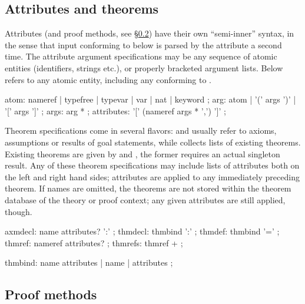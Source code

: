 \subsection{Attributes and theorems}\label{sec:syn-att}

Attributes (and proof methods, see \S\ref{sec:syn-meth}) have their own
``semi-inner'' syntax, in the sense that input conforming to
 below is parsed by the attribute a second time.  The
attribute argument specifications may be any sequence of atomic entities
(identifiers, strings etc.), or properly bracketed argument lists.  Below
 refers to any atomic entity, including any
 conforming to .

\begin{rail}
  atom: nameref | typefree | typevar | var | nat | keyword
  ;
  arg: atom | '(' args ')' | '[' args ']'
  ;
  args: arg *
  ;
  attributes: '[' (nameref args * ',') ']'
  ;
\end{rail}

Theorem specifications come in several flavors:  and
 usually refer to axioms, assumptions or results of goal
statements, while  collects lists of existing theorems.
Existing theorems are given by  and ,
the former requires an actual singleton result.  Any of these theorem
specifications may include lists of attributes both on the left and right hand
sides; attributes are applied to any immediately preceding theorem.  If names
are omitted, the theorems are not stored within the theorem database of the
theory or proof context; any given attributes are still applied, though.

\begin{rail}
  axmdecl: name attributes? ':'
  ;
  thmdecl: thmbind ':'
  ;
  thmdef: thmbind '='
  ;
  thmref: nameref attributes?
  ;
  thmrefs: thmref +
  ;

  thmbind: name attributes | name | attributes
  ;
\end{rail}


\subsection{Proof methods}\label{sec:syn-meth}

